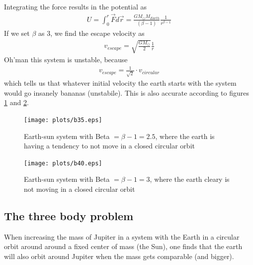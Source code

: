 \documentclass{article}
\begin{document}
Integrating the force results in the potential as
\begin{align*}
  U = \int_0^r \vec{F} d\vec{r} =  \frac{GM_{\odot}M_{Earth}}{(\beta-1)} \frac{1}{r^{\beta-1}}
\end{align*}
If we set $\beta$ as $3$, we find the escape velocity as
\begin{align*}
  v_{escape} = \sqrt{\frac{GM_{\odot}}{2}} \frac{1}{r}
\end{align*}
Oh'man this system is unstable, because
\begin{align*}
  v_{escape} = \frac{1}{\sqrt{2}}\cdot v_{circular}
\end{align*}
which tells us that whatever initial velocity the earth starts with the system would go insanely bananas (unstabile). This is also accurate according to figures \ref{beta25} and \ref{beta35}.

\begin{figure}[H]
  \texttt{[image: plots/b35.eps]}
  \caption{Earth-sun system with Beta $= \beta - 1 = 2.5$, where the earth is having a tendency to not move in a closed circular orbit}
  \label{beta25}
\end{figure}

\begin{figure}[H]
  \texttt{[image: plots/b40.eps]}
  \caption{Earth-sun system with Beta $= \beta - 1 = 3$, where the earth cleary is not moving in a closed circular orbit}
  \label{beta35}
\end{figure}

\subsection{The three body problem}
When increasing the mass of Jupiter in a system with the Earth in a circular orbit around around a fixed center of mass (the Sun), one finds that the earth will also orbit around Jupiter when the mass gets comparable (and bigger).
\end{document}
